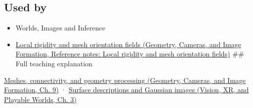 \subsection{Used by}\label{appendix-0234ab7f86b1-used-by}

\begin{itemize}
\item
  {Worlds, Images and Inference}
\item
  \href{../03-Geometry-Cameras-and-Image-Formation/main.pdf\#nameddest=appendix-7107009c505b}{Local rigidity and mesh orientation fields (Geometry, Cameras, and Image Formation, Reference notes: Local rigidity and mesh orientation fields)} \#\# Full teaching explanation
\end{itemize}

\href{../03-Geometry-Cameras-and-Image-Formation/main.pdf\#nameddest=03-visual-computing-i-ch002-meshes-connectivity-and-geometry-processing}{Meshes, connectivity, and geometry processing (Geometry, Cameras, and Image Formation, Ch. 9)} · \href{../07-Vision-XR-and-Playable-Worlds/main.pdf\#nameddest=04-visual-computing-ii-ch032-surface-descriptions-and-gaussian-images}{Surface descriptions and Gaussian images (Vision, XR, and Playable Worlds, Ch. 3)}
